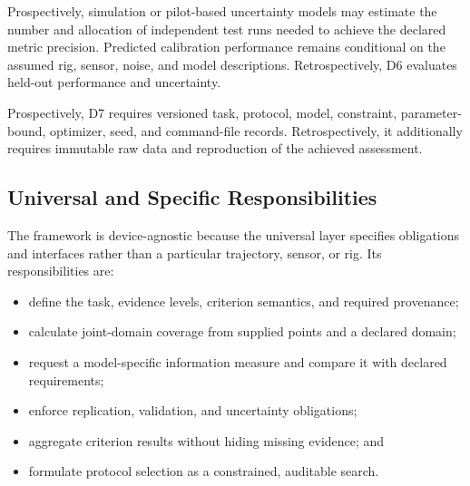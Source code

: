 \documentclass[11pt,a4paper]{article}
\begin{document}
\begin{description}[style=nextline]
    \item[D6---Performance and uncertainty evidence.]
    Prospectively, simulation or pilot-based uncertainty models may estimate
    the number and allocation of independent test runs needed to achieve the
    declared metric precision. Predicted calibration performance remains
    conditional on the assumed rig, sensor, noise, and model descriptions.
    Retrospectively, D6 evaluates held-out performance and uncertainty.

    \item[D7---Reproducibility and provenance.]
    Prospectively, D7 requires versioned task, protocol, model, constraint,
    parameter-bound, optimizer, seed, and command-file records.
    Retrospectively, it additionally requires immutable raw data and
    reproduction of the achieved assessment.
\end{description}

\subsection{Universal and Specific Responsibilities}

The framework is device-agnostic because the universal layer specifies
obligations and interfaces rather than a particular trajectory, sensor, or
rig. Its responsibilities are:
\begin{itemize}
    \item define the task, evidence levels, criterion semantics, and required
        provenance;
    \item calculate joint-domain coverage from supplied points and a declared
        domain;
    \item request a model-specific information measure and compare it with
        declared requirements;
    \item enforce replication, validation, and uncertainty obligations;
    \item aggregate criterion results without hiding missing evidence; and
    \item formulate protocol selection as a constrained, auditable search.
\end{itemize}
\end{document}

